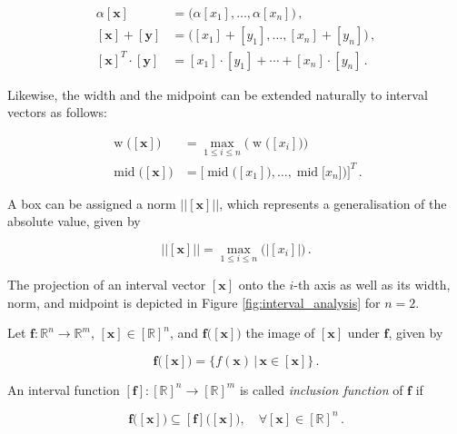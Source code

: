 \begin{align}
\alpha[\bm{x}] &= \big(\alpha [x_1], \dots, \alpha [x_n]\big)\,, \\
[\bm{x}] + [\bm{y}] &= \big([x_1] + [y_1], \dots, [x_n] + [y_n]\big)\,, \\
[\bm{x}]^T \cdot [\bm{y}] &= [x_1] \cdot [y_1] + \cdots + [x_n] \cdot [y_n] \,.
\end{align}

\noindent
Likewise, the width and the midpoint can be extended naturally to interval vectors as follows:


\begin{align}
\operatorname{w}\big([\bm{x}]\big) &= \underset{1 \leq i \leq n}{\max}\Big(\operatorname{w}\big([x_i]\big)\Big) \\
\operatorname{mid}\big([\bm{x}]\big) &= \bigg[\operatorname{mid}\big([x_1]\big), \dots , \operatorname{mid}\big[x_n]\big)\bigg]^T\,.
\end{align}

\noindent
A box can be assigned a norm $\big|\big|[\bm{x}]\big|\big|$, which represents a generalisation of the absolute value, given by

\begin{equation}
\big|\big|[\bm{x}]\big|\big| = \underset{1 \leq i \leq n}{\max}\Big(\big|[x_i]\big|\Big)\,.
\end{equation}



\noindent
The projection of an interval vector $[\bm{x}]$ onto the $i$-th axis as well as its width, norm, and midpoint is depicted in Figure \ref{fig:interval_analysis} for $n = 2$.



Let $\bm{f}: \mathbb{R}^n \rightarrow \mathbb{R}^m$, $[\bm{x}] \in [\mathbb{R}]^n$, and $\bm{f}\big([\bm{x}]\big)$ the image of $[\bm{x}]$ under $\bm{f}$, given by

\begin{equation}
\bm{f}\big([\bm{x}]\big) = \big\{f(\bm{x}) \,|\, \bm{x} \in [\bm{x}]\big\} \,.
\end{equation}

\noindent
An interval function $[\bm{f}]: [\mathbb{R}]^n \rightarrow [\mathbb{R}]^m$ is called \emph{inclusion function} of $\bm{f}$ if
 
 \begin{equation}
  \bm{f}\big([\bm{x}]\big) \subseteq [\bm{f}]\big([\bm{x}]\big), \quad \forall [\bm{x}] \in [\mathbb{R}]^n\,.
\end{equation}


